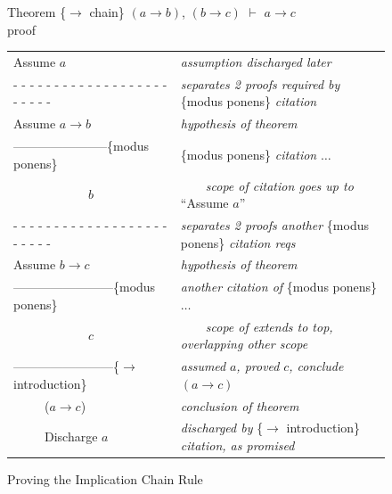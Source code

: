 {\begin{figure}
Theorem \{$\rightarrow$ chain\}
$(a \rightarrow b)$, $(b \rightarrow c)$ $\vdash$ $a \rightarrow c$ \\
proof
\begin{center}
\begin{tabular}{ll}
Assume $a$                                             &\emph{assumption discharged later}\\
 - - - - - - - - - - - - - - - - - - - - - - - -       &\emph{separates 2 proofs required by} \{modus ponens\} \emph{citation}\\
Assume $a \rightarrow b$                               &\emph{hypothesis of theorem}\\
-----------------------\{modus ponens\}                &\{modus ponens\} \emph{citation} $\dots$\\
~~~~~~~~~~~~$b$                                        &~~~~\emph{scope of citation goes up to} ``Assume $a$''\\
 - - - - - - - - - - - - - - - - - - - - - - - -       &\emph{separates 2 proofs another} \{modus ponens\} \emph{citation reqs}\\
Assume $b \rightarrow c$                               &\emph{hypothesis of theorem}\\
------------------------\{modus ponens\}               &\emph{another citation of} \{modus ponens\} $\dots$\\
~~~~~~~~~~~~$c$                                        &~~~~\emph{scope of extends to top, overlapping other scope}\\
------------------------\{$\rightarrow$ introduction\} &\emph{assumed} $a$\emph{, proved} $c$\emph{, conclude} $(a \rightarrow c)$\\
~~~~~($a \rightarrow c$)                               &\emph{conclusion of theorem} \\
~~~~~Discharge $a$                                     &\emph{discharged by} \{$\rightarrow$ introduction\} \emph{citation}\emph{, as promised}\\
\end{tabular}
\end{center}
\caption{Proving the Implication Chain Rule}
\label{fig:impchain-proof}
\end{figure}

}
